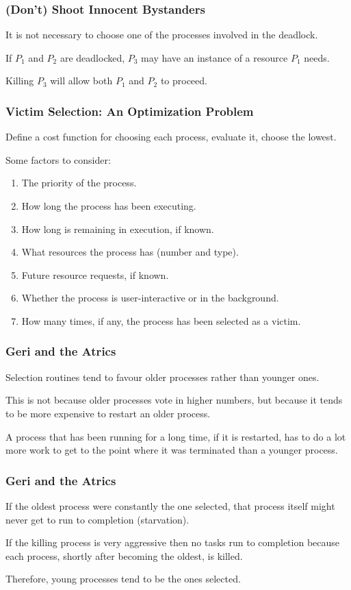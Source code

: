 \begin{frame}
\frametitle{(Don't) Shoot Innocent Bystanders}

It is not necessary to choose one of the processes involved in the deadlock. 

If $P_{1}$ and $P_{2}$ are deadlocked, $P_{3}$  may have an instance of a resource $P_{1}$ needs. 

Killing $P_{3}$ will allow both $P_{1}$ and $P_{2}$ to proceed.

\end{frame}

\begin{frame}
\frametitle{Victim Selection: An Optimization Problem}

Define a cost function for choosing each process, evaluate it, choose the lowest.

Some factors to consider:

\begin{enumerate}
	\item The priority of the process.
	\item How long the process has been executing.
	\item How long is remaining in execution, if known.
	\item What resources the process has (number and type).
	\item Future resource requests, if known.
	\item Whether the process is user-interactive or in the background.
	\item How many times, if any, the process has been selected as a victim.
\end{enumerate}

\end{frame}

\begin{frame}
\frametitle{Geri and the Atrics}

Selection routines tend to favour older processes rather than younger ones. 

This is not because older processes vote in higher numbers, but because it tends to be more expensive to restart an older process. 

A process that has been running for a long time, if it is restarted, has to do a lot more work to get to the point where it was terminated than a younger process. 

\end{frame}

\begin{frame}
\frametitle{Geri and the Atrics}

If the oldest process were constantly the one selected, that process itself might never get to run to completion (starvation).

If the killing process is very aggressive then no tasks run to completion because each process, shortly after becoming the oldest, is killed.


Therefore, young processes tend to be the ones selected.

\end{frame}

